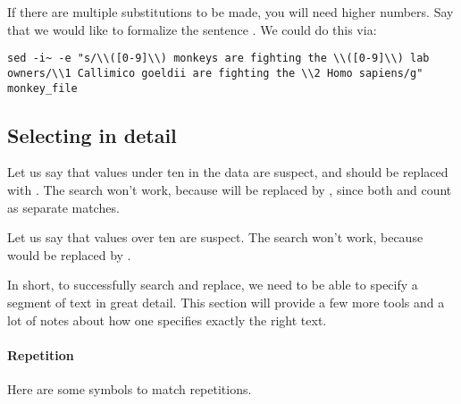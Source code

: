If there are multiple substitutions to be made, you will need higher
numbers. Say that we would like to formalize the sentence . We could do this via:
\begin{lstlisting}
sed -i~ -e "s/\\([0-9]\\) monkeys are fighting the \\([0-9]\\) lab owners/\\1 Callimico goeldii are fighting the \\2 Homo sapiens/g" monkey_file
\end{lstlisting}

\subsection{Selecting in detail}
Let us say that values under ten in the data are suspect, and should be
replaced with . The search  won't work,
because  will be replaced by , since both 
and  count as separate matches. 

Let us say that values over ten are suspect. The search
 won't work, because  would be replaced by
.

In short, to successfully search and replace, we need to be able to
specify a segment of text in great detail. This section will provide a
few more tools and a lot of notes about how one specifies exactly the
right text.

\paragraph{Repetition} 
Here are some symbols to match repetitions.
\begin{center}
\end{center}


